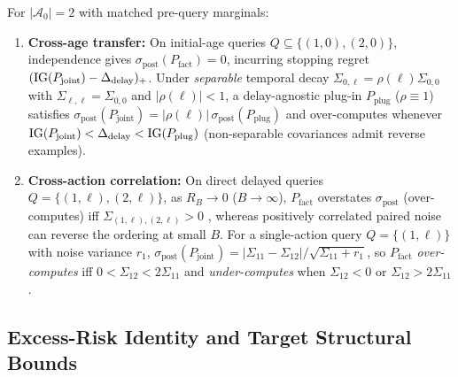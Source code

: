 \begin{lemma}\label{lem:regimes}
For $|\mathcal{A}_0|=2$ with matched pre-query marginals:
\begin{enumerate}\setlength{\itemsep}{1pt}\setlength{\parskip}{0pt}
\item \textbf{Cross-age transfer:} On initial-age queries $Q \subseteq \{(1,0),(2,0)\}$, independence gives $\sigma_{\mathrm{post}}(P_{\mathrm{fact}}) = 0$, incurring stopping regret $(\operatorname{IG}(P_{\mathrm{joint}}) - \Delta_{\mathrm{delay}})_+$. Under \emph{separable} temporal decay $\Sigma_{0,\ell} = \rho(\ell)\Sigma_{0,0}$ with $\Sigma_{\ell,\ell} = \Sigma_{0,0}$ and $|\rho(\ell)| < 1$, a delay-agnostic plug-in $P_{\mathrm{plug}}$ ($\rho \equiv 1$) satisfies $\sigma_{\mathrm{post}}(P_{\mathrm{joint}}) = |\rho(\ell)|\,\sigma_{\mathrm{post}}(P_{\mathrm{plug}})$ and over-computes whenever $\operatorname{IG}(P_{\mathrm{joint}}) < \Delta_{\mathrm{delay}} < \operatorname{IG}(P_{\mathrm{plug}})$ (non-separable covariances admit reverse examples).
\item \textbf{Cross-action correlation:} On direct delayed queries $Q = \{(1,\ell),(2,\ell)\}$, as $R_B \to 0$ ($B \to \infty$), $P_{\mathrm{fact}}$ overstates $\sigma_{\mathrm{post}}$ (over-computes) iff $\Sigma_{(1,\ell),(2,\ell)} > 0$ \citep{xie2016pairwise}, whereas positively correlated paired noise can reverse the ordering at small $B$. For a single-action query $Q = \{(1,\ell)\}$ with noise variance $r_1$, $\sigma_{\mathrm{post}}(P_{\mathrm{joint}}) = |\Sigma_{11} - \Sigma_{12}|/\sqrt{\Sigma_{11}+r_1}$, so $P_{\mathrm{fact}}$ \emph{over-computes} iff $0 < \Sigma_{12} < 2\Sigma_{11}$ and \emph{under-computes} when $\Sigma_{12} < 0$ or $\Sigma_{12} > 2\Sigma_{11}$.
\end{enumerate}
\end{lemma}

\subsection{Excess-Risk Identity and Target Structural Bounds}

